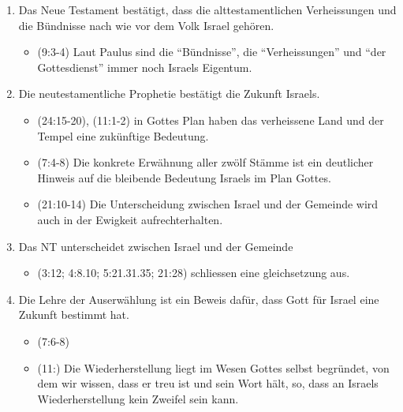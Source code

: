 \documentclass{../../inc/mybib}
\begin{document}
\begin{enumerate}
\begin{itemize}
    \end{itemize}
    \item Das Neue Testament bestätigt, dass die alttestamentlichen Verheissungen und die Bündnisse nach wie vor dem Volk Israel gehören.
    \begin{itemize}
        \item {}(9:3-4) Laut Paulus sind die \enquote{Bündnisse}, die \enquote{Verheissungen} und \enquote{der Gottesdienst} immer noch Israels Eigentum.
    \end{itemize}
    \item Die neutestamentliche Prophetie bestätigt die Zukunft Israels.
    \begin{itemize}
        \item {}(24:15-20), (11:1-2) in Gottes Plan haben das verheissene Land und der Tempel eine zukünftige Bedeutung.
        \item {}(7:4-8) Die konkrete Erwähnung aller zwölf Stämme ist ein deutlicher Hinweis auf die bleibende Bedeutung Israels im Plan Gottes.
        \item {}(21:10-14) Die Unterscheidung zwischen Israel und der Gemeinde wird auch in der Ewigkeit aufrechterhalten.
    \end{itemize}
    \item Das NT unterscheidet zwischen Israel und der Gemeinde
    \begin{itemize}
        \item {}(3:12; 4:8.10; 5:21.31.35; 21:28) schliessen eine gleichsetzung aus.
    \end{itemize}
    \item Die Lehre der Auserwählung ist ein Beweis dafür, dass Gott für Israel eine Zukunft bestimmt hat.
    \begin{itemize}
        \item {}(7:6-8)
        \item {}(11:) Die Wiederherstellung liegt im Wesen Gottes selbst begründet, von dem wir wissen, dass er treu ist und sein Wort hält, so, dass an Israels Wiederherstellung kein Zweifel sein kann.
    \end{itemize}    
\end{enumerate}
\end{document}
